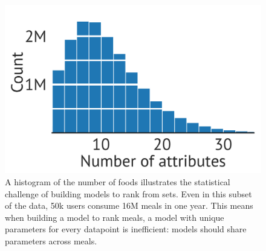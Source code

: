 \begin{figure}[t!]
  \centering
  \includegraphics[width=0.6\linewidth]{ch-rfs/fig/hist_meals}
  \caption{A histogram of the number of foods illustrates the statistical
    challenge of building models to rank from sets. Even in this subset of the
    data, 50k users consume 16M meals in one year. This means when building a
    model to rank meals, a model with unique parameters for every datapoint is
    inefficient: models should share parameters across meals.}
  \label{fig:hist}
\end{figure}
